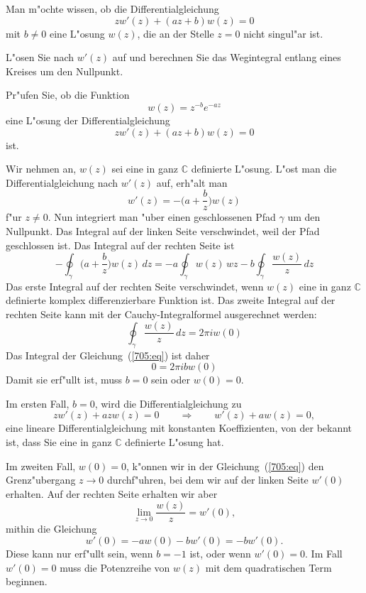 Man m"ochte wissen, ob die Differentialgleichung
\[
zw'(z)+(az+b)w(z)=0
\]
mit $b\ne 0$ eine L"osung $w(z)$, die an der Stelle $z=0$
nicht singul"ar ist.

\begin{hinweis}
L"osen Sie nach $w'(z)$ auf und berechnen Sie das Wegintegral
entlang eines Kreises um den Nullpunkt.
\end{hinweis}

Pr"ufen Sie, ob die Funktion
\[
w(z) = z^{-b}e^{-az}
\]
eine L"osung der Differentialgleichung
\[
zw'(z)+(az+b)w(z)=0
\]
ist.

\begin{loesung}
Wir nehmen an, $w(z)$ sei eine in ganz $\mathbb C$ definierte L"osung.
L"ost man die Differentialgleichung nach $w'(z)$ auf, erh"alt man
\begin{equation}
w'(z) = -\biggl(a+\frac{b}z\biggr)w(z)
\label{705:eq}
\end{equation}
f"ur $z\ne 0$.
Nun integriert man "uber einen geschlossenen Pfad $\gamma$ um den 
Nullpunkt.
Das Integral auf der linken Seite verschwindet, weil der Pfad geschlossen
ist.
Das Integral auf der rechten Seite ist 
\[
-\oint_\gamma 
\biggl(a+\frac{b}z\biggr)w(z)\,dz
=
-a\oint_\gamma w(z)\,wz
-
b\oint_\gamma \frac{w(z)}z\,dz
\]
Das erste Integral auf der rechten Seite verschwindet, wenn $w(z)$ eine
in ganz $\mathbb C$ definierte komplex differenzierbare Funktion ist.
Das zweite Integral auf der rechten Seite kann mit der Cauchy-Integralformel
ausgerechnet werden:
\[
\oint_\gamma \frac{w(z)}z\,dz
=
2\pi i w(0)
\]
Das Integral der Gleichung~(\ref{705:eq}) ist daher
\[
0=2\pi i b w(0)
\]
Damit sie erf"ullt ist, muss $b=0$ sein oder $w(0)=0$.

Im ersten Fall, $b=0$, wird die Differentialgleichung zu
\[
zw'(z)+azw(z)=0
\qquad\Rightarrow\qquad
w'(z)+aw(z)=0,
\]
eine lineare Differentialgleichung mit konstanten Koeffizienten, von der
bekannt ist, dass Sie eine in ganz $\mathbb C$ definierte L"osung hat.

Im zweiten Fall, $w(0)=0$, k"onnen wir in der Gleichung~(\ref{705:eq}) 
den Grenz"ubergang $z\to 0$ durchf"uhren, bei dem wir auf der
linken Seite $w'(0)$ erhalten.
Auf der rechten Seite erhalten wir aber
\[
 \lim_{z\to 0}\frac{w(z)}{z}=w'(0),
\]
mithin die Gleichung
\[
w'(0)=-aw(0)-bw'(0)=-bw'(0).
\]
Diese kann nur erf"ullt sein, wenn $b=-1$ ist, oder wenn $w'(0)=0$.
Im Fall $w'(0)=0$ muss die Potenzreihe von $w(z)$ mit dem quadratischen
Term beginnen.
\end{loesung}

